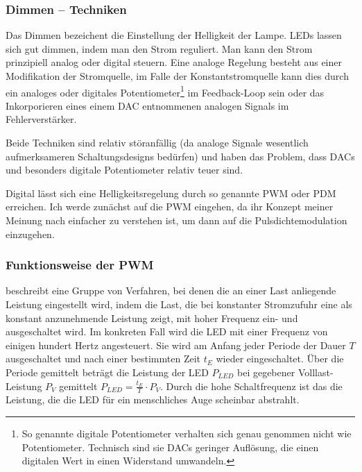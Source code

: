 \documentclass[12pt,a4paper,notitlepage]{article}
\begin{document}
\subsubsection{Dimmen -- Techniken}
Das Dimmen bezeichent die Einstellung der Helligkeit der Lampe. \glspl{LED} lassen sich gut dimmen, indem man den Strom reguliert. Man kann den Strom prinzipiell analog oder digital steuern. Eine analoge Regelung besteht aus einer Modifikation der Stromquelle, im Falle der Konstantstromquelle kann dies durch ein analoges oder digitales Potentiometer\footnote{So genannte digitale Potentiometer verhalten sich genau genommen nicht wie Potentiometer. Technisch sind sie \glspl{DAC} geringer Auflösung, die einen digitalen Wert in einen Widerstand umwandeln.} im Feedback-Loop sein oder das Inkorporieren eines einem \gls{DAC} entnommenen analogen Signals im Fehlerverstärker\cite{MAXIM23,MAXIM41,MAXIM42,ANALOG4,ANALOG5}.

Beide Techniken sind relativ störanfällig (da analoge Signale wesentlich aufmerksameren Schaltungsdesigns bedürfen) und haben das Problem, dass \glspl{DAC} und besonders digitale Potentiometer relativ teuer sind.

Digital lässt sich eine Helligkeitsregelung durch so genannte \gls{PWM} oder \gls{PDM} erreichen. Ich werde zunächst auf die \gls{PWM} eingehen, da ihr Konzept meiner Meinung nach einfacher zu verstehen ist, um dann auf die Pulsdichtemodulation einzugehen.

\subsubsection{Funktionsweise der PWM}
 beschreibt eine Gruppe von Verfahren, bei denen die an einer Last anliegende Leistung eingestellt wird, indem die Last, die bei konstanter Stromzufuhr eine als konstant anzunehmende Leistung zeigt, mit hoher Frequenz ein- und ausgeschaltet wird. Im konkreten Fall wird die \gls{LED} mit einer Frequenz von einigen hundert \gls{Hertz} angesteuert. Sie wird am Anfang jeder Periode der Dauer $T$ ausgeschaltet und nach einer bestimmten Zeit $t_E$ wieder eingeschaltet. Über die Periode gemittelt beträgt die Leistung der \gls{LED} $P_{LED}$ bei gegebener Volllast-Leistung $P_V$ gemittelt $P_{LED}=\frac{t_E}{T}\cdot P_{V}$. Durch die hohe Schaltfrequenz ist das die Leistung, die die \gls{LED} für ein menschliches Auge scheinbar abstrahlt.
\end{document}
